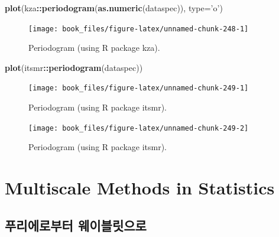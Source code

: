 \documentclass[b5paper,]{scrbook}
\makeatletter
\newenvironment{Shaded}{\begin{snugshade}}{\end{snugshade}}
\newcommand{\DataTypeTok}[1]{\textcolor[rgb]{0.13,0.29,0.53}{#1}}
\newcommand{\KeywordTok}[1]{\textcolor[rgb]{0.13,0.29,0.53}{\textbf{#1}}}
\newcommand{\NormalTok}[1]{#1}
\newcommand{\OperatorTok}[1]{\textcolor[rgb]{0.81,0.36,0.00}{\textbf{#1}}}
\newcommand{\StringTok}[1]{\textcolor[rgb]{0.31,0.60,0.02}{#1}}
\theoremstyle{plain}
\theoremstyle{definition}
\numberwithin{equation}{section}
\newenvironment{kframe}{%
\medskip{}
\setlength{\fboxsep}{.8em}
 \def\at@end@of@kframe{}%
 \ifinner\ifhmode%
  \def\at@end@of@kframe{\end{minipage}}%
  \begin{minipage}{\columnwidth}%
 \fi\fi%
 \def\FrameCommand##1{\hskip\@totalleftmargin \hskip-\fboxsep
 \colorbox{shadecolor}{##1}\hskip-\fboxsep
     \hskip-\linewidth \hskip-\@totalleftmargin \hskip\columnwidth}%
 \MakeFramed {\advance\hsize-\width
   \@totalleftmargin\z@ \linewidth\hsize
   \@setminipage}}%
 {\par\unskip\endMakeFramed%
 \at@end@of@kframe}
\renewenvironment{Shaded}{\begin{kframe}}{\end{kframe}}
\makeatother
\begin{document}
\begin{Shaded}
\begin{Highlighting}[]
\KeywordTok{plot}\NormalTok{(kza}\OperatorTok{::}\KeywordTok{periodogram}\NormalTok{(}\KeywordTok{as.numeric}\NormalTok{(dataspec)), }\DataTypeTok{type=}\StringTok{'o'}\NormalTok{)}
\end{Highlighting}
\end{Shaded}

\begin{figure}

{\centering \texttt{[image: book\_files/figure-latex/unnamed-chunk-248-1]} 

}

\caption{Periodogram (using R package kza).}\label{fig:unnamed-chunk-248}
\end{figure}

\begin{Shaded}
\begin{Highlighting}[]
\KeywordTok{plot}\NormalTok{(itsmr}\OperatorTok{::}\KeywordTok{periodogram}\NormalTok{(dataspec))}
\end{Highlighting}
\end{Shaded}

\begin{figure}

{\centering \texttt{[image: book\_files/figure-latex/unnamed-chunk-249-1]} 

}

\caption{Periodogram (using R package itsmr).}\label{fig:unnamed-chunk-2491}
\end{figure}
\begin{figure}

{\centering \texttt{[image: book\_files/figure-latex/unnamed-chunk-249-2]} 

}

\caption{Periodogram (using R package itsmr).}\label{fig:unnamed-chunk-2492}
\end{figure}

\hypertarget{part-multiscale-methods-in-statistics}{%
\part{Multiscale Methods in Statistics}\label{part-multiscale-methods-in-statistics}}

\hypertarget{fouriertowavelet}{%
\chapter{푸리에로부터 웨이블릿으로}\label{fouriertowavelet}}
\end{document}
